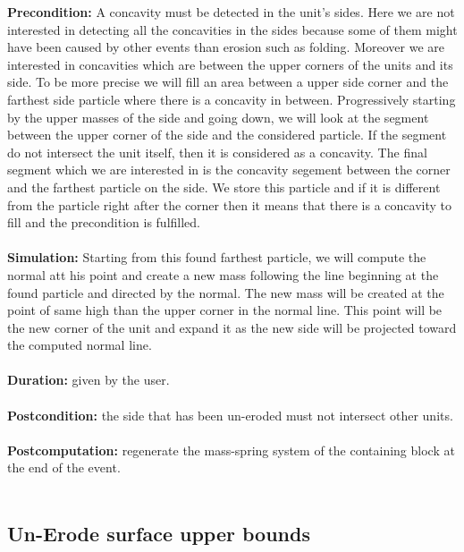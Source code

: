 \documentclass[12pt, a4paper]{report} %
\begin{document}
\textbf{Precondition:} A concavity must be detected in the unit's sides. Here we are not interested in detecting all the concavities in the sides because some of them might have been caused by other events than erosion such as folding. Moreover we are interested in concavities which are between the upper corners of the units and its side. To be more precise we will fill an area between a upper side corner and the farthest side particle where there is a concavity in between. Progressively starting by the upper masses of the side and going down, we will look at the segment between the upper corner of the side and the considered particle. If the segment do not intersect the unit itself, then it is considered as a concavity. The final segment which we are interested in is the concavity segement between the corner and the farthest particle on the side. We store this particle and if it is different from the particle right after the corner then it means that there is a concavity to fill and the precondition is fulfilled.\\\\
\textbf{Simulation:}  Starting from this found farthest particle, we will compute the normal att his point and create a new mass following the line beginning at the found particle and directed by the normal. The new mass will be created at the point of same high than the upper corner in the normal line. This point will be the new corner of the unit and expand it as the new side will be projected toward the computed normal line.\\\\
\textbf{Duration:} given by the user.\\\\
\textbf{Postcondition:} the side that has been un-eroded must not intersect other units.\\\\
\textbf{Postcomputation:} regenerate the mass-spring system of the containing block at the end of the event.\\\\

\subsection{Un-Erode surface upper bounds}
\end{document}
